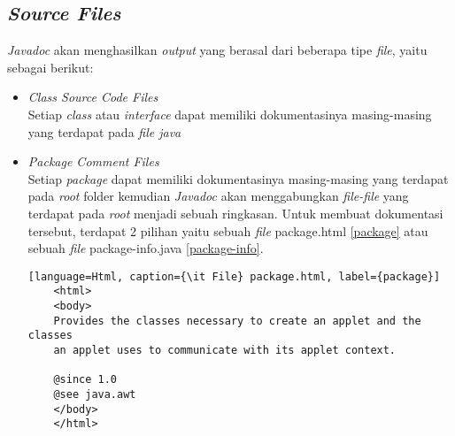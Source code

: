 \subsection{\textit{Source Files}}
\label{sec:source-files}
{\it Javadoc} akan menghasilkan {\it output} yang berasal dari beberapa tipe {\it file}, yaitu sebagai berikut:
\begin{itemize}
	\item {\it Class Source Code Files}\\
	Setiap {\it class} atau {\it interface} dapat memiliki dokumentasinya masing-masing yang terdapat pada {\it file java}
	\item {\it Package Comment Files}\\
	Setiap {\it package} dapat memiliki dokumentasinya masing-masing yang terdapat pada {\it root} folder kemudian {\it Javadoc} akan menggabungkan {\it file-file} yang terdapat pada {\it root} menjadi sebuah ringkasan. Untuk membuat dokumentasi tersebut, terdapat 2 pilihan yaitu sebuah {\it file} package.html \ref{package} atau sebuah {\it file} package-info.java \ref{package-info}.
	\begin{lstlisting}[language=Html, caption={\it File} package.html, label={package}]
	<html>
	<body>
	Provides the classes necessary to create an applet and the classes
	an applet uses to communicate with its applet context.
	
	@since 1.0
	@see java.awt
	</body>
	</html>
	\end{lstlisting}
	

\end{itemize}
